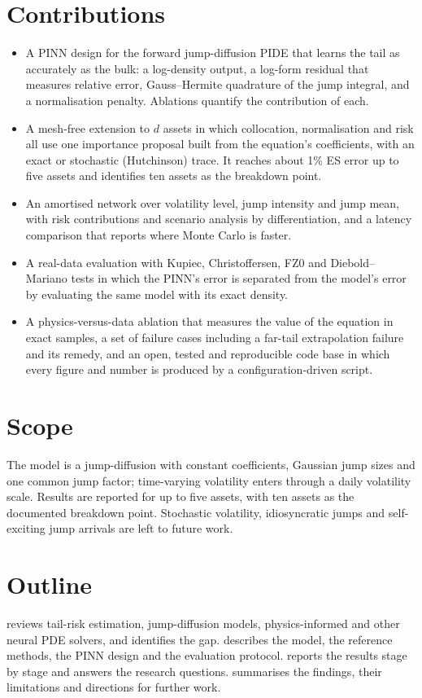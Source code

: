 \section{Contributions}
\begin{itemize}
  \item A PINN design for the forward jump-diffusion PIDE that learns the tail as accurately as the bulk: a
    log-density output, a log-form residual that measures relative error, Gauss--Hermite quadrature of the jump
    integral, and a normalisation penalty. Ablations quantify the contribution of each.
  \item A mesh-free extension to $d$ assets in which collocation, normalisation and risk all use one importance
    proposal built from the equation's coefficients, with an exact or stochastic (Hutchinson) trace. It reaches
    about 1\% ES error up to five assets and identifies ten assets as the breakdown point.
  \item An amortised network over volatility level, jump intensity and jump mean, with risk contributions and
    scenario analysis by differentiation, and a latency comparison that reports where Monte Carlo is faster.
  \item A real-data evaluation with Kupiec, Christoffersen, FZ0 and Diebold--Mariano tests in which the PINN's
    error is separated from the model's error by evaluating the same model with its exact density.
  \item A physics-versus-data ablation that measures the value of the equation in exact samples, a set of failure
    cases including a far-tail extrapolation failure and its remedy, and an open, tested and reproducible code
    base in which every figure and number is produced by a configuration-driven script.
\end{itemize}

\section{Scope}
The model is a jump-diffusion with constant coefficients, Gaussian jump sizes and one common jump factor;
time-varying volatility enters through a daily volatility scale. Results are reported for up to five assets,
with ten assets as the documented breakdown point. Stochastic volatility, idiosyncratic jumps and self-exciting
jump arrivals are left to future work.

\section{Outline}
 reviews tail-risk estimation, jump-diffusion models, physics-informed and other neural PDE
solvers, and identifies the gap.  describes the model, the reference methods, the PINN
design and the evaluation protocol.  reports the results stage by stage and answers the research
questions.  summarises the findings, their limitations and directions for further work.
